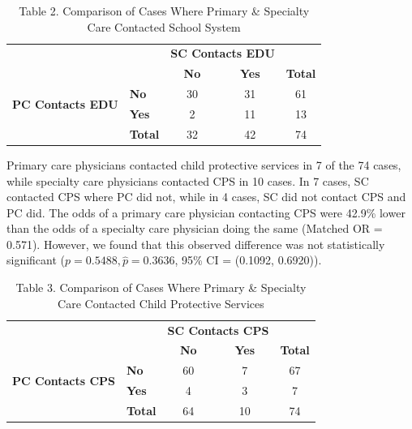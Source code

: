 \documentclass{article}
\begin{document}
	\newpage
	\begin{table}[h]
		\centering
		\footnotesize
		\captionsetup{labelformat=empty}
		\caption{Table 2. Comparison of Cases Where Primary \& Specialty Care Contacted School System}
		\renewcommand{\arraystretch}{1.2}
		\begin{tabular}{llccc}
			\toprule
			& & \multicolumn{2}{c}{\textbf{SC Contacts EDU}} & \\  
			\cmidrule(lr){3-4}
			& & \textbf{No} & \textbf{Yes} & \textbf{Total} \\  
			\midrule
			\multirow{2}{*}{\textbf{PC Contacts EDU}} & \textbf{No} & 30 & 31 & 61 \\  
			& \textbf{Yes} & 2 & 11 & 13 \\  
			\midrule
			& \textbf{Total} & 32 & 42 & 74 \\  
			\bottomrule
		\end{tabular}
		\label{tab:pc_sc_edu}
	\end{table}

	Primary care physicians contacted child protective services in 7 of the 74 cases, while specialty care physicians contacted CPS in 10 cases. In 7 cases, SC contacted CPS where PC did not, while in 4 cases, SC did not contact CPS and PC did. The odds of a primary care physician contacting CPS were 42.9\% lower than the odds of a specialty care physician doing the same (Matched OR = 0.571). However, we found that this observed difference was not statistically significant ($p = 0.5488, \hat{p} = 0.3636$, 95\% CI = (0.1092, 0.6920)).

	\begin{table}[h]
		\centering
		\footnotesize
		\captionsetup{labelformat=empty}
		\caption{Table 3. Comparison of Cases Where Primary \& Specialty Care Contacted Child Protective Services}
		\renewcommand{\arraystretch}{1.2}
		\begin{tabular}{llccc}
			\toprule
			& & \multicolumn{2}{c}{\textbf{SC Contacts CPS}} & \\  
			\cmidrule(lr){3-4}
			& & \textbf{No} & \textbf{Yes} & \textbf{Total} \\  
			\midrule
			\multirow{2}{*}{\textbf{PC Contacts CPS}} & \textbf{No} & 60 & 7 & 67 \\  
			& \textbf{Yes} & 4 & 3 & 7 \\  
			\midrule
			& \textbf{Total} & 64 & 10 & 74 \\  
			\bottomrule
		\end{tabular}
		\label{tab:pc_sc_cps}
	\end{table}
\end{document}
